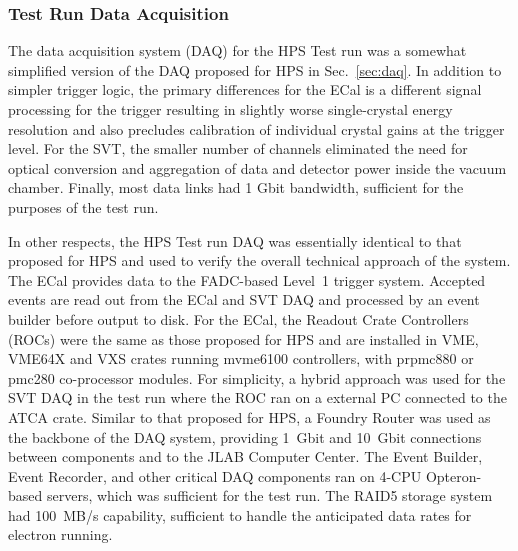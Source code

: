 
\subsubsection{Test Run Data Acquisition}
\label{sec:testrun_daq}


The data acquisition system (DAQ) for the HPS Test run was a somewhat simplified version of the DAQ proposed for HPS in Sec.~\ref{sec:daq}. In addition to simpler trigger logic,
the primary differences for the ECal is a different signal processing for the trigger resulting in slightly worse
single-crystal energy resolution and also precludes calibration of individual crystal gains at the trigger level.  For the SVT, the smaller
number of channels eliminated the need for optical conversion and aggregation of data and detector power inside the vacuum chamber.
Finally, most data links had 1 Gbit bandwidth, sufficient for the purposes of the test run.

In other respects, the HPS Test run DAQ was essentially identical to that proposed for HPS and used to verify the overall technical approach of the system. The ECal provides data to the FADC-based Level~1
trigger system. Accepted events are read out from the ECal and SVT DAQ and processed by an event builder before output to disk.
For the ECal, the Readout Crate Controllers (ROCs) were the same as those proposed for HPS and are installed in VME, VME64X and VXS 
crates running mvme6100 controllers, with prpmc880 or pmc280 co-processor modules. For simplicity, a hybrid approach was 
used for the SVT DAQ in the test run where the ROC ran on a external PC connected to the ATCA crate. Similar to that proposed for HPS, a 
Foundry Router was used as the backbone of the DAQ system, providing 1~Gbit and 10~Gbit connections between components 
and to the JLAB Computer Center. The Event Builder, Event Recorder, and other critical DAQ components ran on 4-CPU Opteron-based servers, 
which was sufficient for the test run. The RAID5 storage system had 100~MB/s capability, sufficient to handle the anticipated data rates for electron running.


